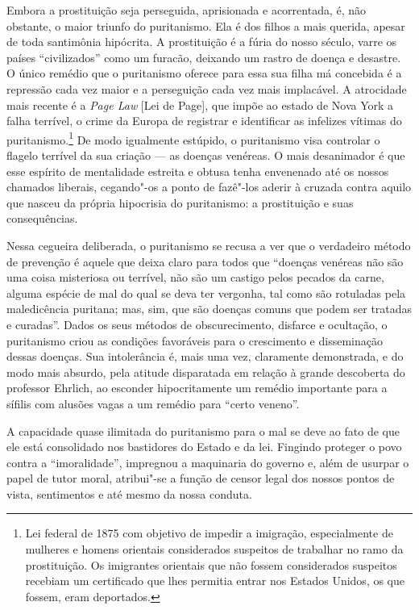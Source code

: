 Embora a prostituição seja perseguida, aprisionada e acorrentada, é, não
obstante, o maior triunfo do puritanismo. Ela é dos filhos a mais
querida, apesar de toda santimônia hipócrita. A prostituição é a
fúria do nosso século, varre os países ``civilizados'' como um furacão,
deixando um rastro de doença e desastre. O único remédio que o
puritanismo oferece para essa sua filha má concebida é a repressão cada
vez maior e a perseguição cada vez mais implacável. A atrocidade mais
recente é a \emph{Page Law} {[}Lei de Page{]}, que impõe ao estado de Nova York
a falha terrível, o crime da Europa de registrar e identificar as
infelizes vítimas do puritanismo.\footnote{Lei federal de 1875 com
  objetivo de impedir a imigração, especialmente de mulheres e homens orientais considerados suspeitos de trabalhar no ramo da prostituição.
  Os imigrantes orientais que não fossem
  considerados suspeitos recebiam um certificado que lhes permitia
  entrar nos Estados Unidos, os que fossem, eram deportados.} De modo
igualmente estúpido, o puritanismo visa controlar o flagelo terrível da
sua criação --- as doenças venéreas. O mais desanimador é que esse
espírito de mentalidade estreita e obtusa tenha envenenado até os nossos
chamados liberais, cegando"-os a ponto de fazê"-los aderir à cruzada
contra aquilo que nasceu da própria hipocrisia do puritanismo: a
prostituição e suas consequências. 

Nessa cegueira deliberada, o
puritanismo se recusa a ver que o verdadeiro método de prevenção é
aquele que deixa claro para todos que ``doenças venéreas não são uma
coisa misteriosa ou terrível, não são um castigo pelos pecados da carne,
alguma espécie de mal do qual se deva ter vergonha, tal como são
rotuladas pela maledicência puritana; mas, sim, que são doenças comuns
que podem ser tratadas e curadas''. Dados os seus métodos de
obscurecimento, disfarce e ocultação, o puritanismo criou as condições
favoráveis para o crescimento e disseminação dessas doenças. Sua
intolerância é, mais uma vez, claramente demonstrada, e do modo mais
absurdo, pela atitude disparatada em relação à grande descoberta do
professor Ehrlich, ao esconder hipocritamente um remédio importante para a
sífilis com alusões vagas a um remédio para ``certo veneno''.

A capacidade quase ilimitada do puritanismo para o mal se deve ao fato
de que ele está consolidado nos bastidores do Estado e da lei. Fingindo
proteger o povo contra a ``imoralidade'', impregnou a maquinaria do
governo e, além de usurpar o papel de tutor moral, atribui"-se a função de
censor legal dos nossos pontos de vista, sentimentos e até mesmo da
nossa conduta.

